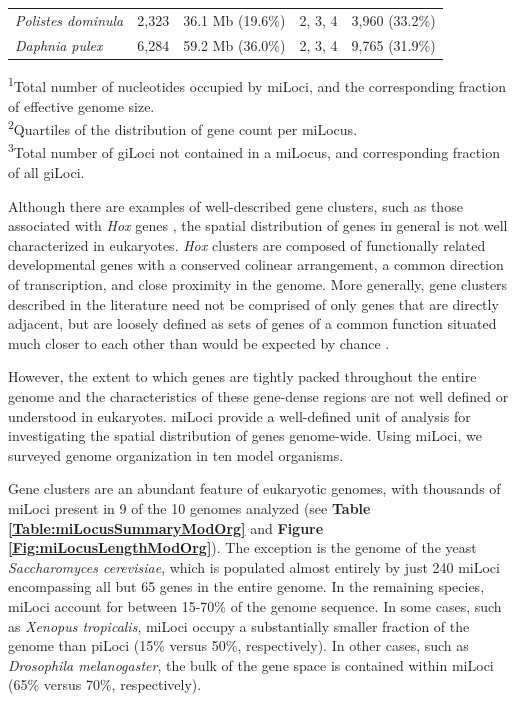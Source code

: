 \begin{table}[h]
\begin{tabularx}{\textwidth}{p{4cm}rrrr}
\textit{Polistes dominula}          &                2,323 &             36.1 Mb (19.6\%) &                       2, 3, 4 &                3,960 (33.2\%)  \\
\textit{Daphnia pulex}              &                6,284 &             59.2 Mb (36.0\%) &                       2, 3, 4 &                9,765 (31.9\%)  \\ \hline
\end{tabularx}
\raggedright
{\scriptsize
\textsuperscript{1}Total number of nucleotides occupied by miLoci, and the corresponding fraction of effective genome size. \\
\textsuperscript{2}Quartiles of the distribution of gene count per miLocus. \\
\textsuperscript{3}Total number of giLoci not contained in a miLocus, and corresponding fraction of all giLoci. \\
}
\end{table}

Although there are examples of well-described gene clusters, such as those associated with \textit{Hox} genes \cite{HoxClusters}, the spatial distribution of genes in general is not well characterized in eukaryotes.
\textit{Hox} clusters are composed of functionally related developmental genes with a conserved colinear arrangement, a common direction of transcription, and close proximity in the genome.
More generally, gene clusters described in the literature need not be comprised of only genes that are directly adjacent, but are loosely defined as sets of genes of a common function situated much closer to each other than would be expected by chance \cite{ClusterFunc}.

However, the extent to which genes are tightly packed throughout the entire genome and the characteristics of these gene-dense regions are not well defined or understood in eukaryotes.
miLoci provide a well-defined unit of analysis for investigating the spatial distribution of genes genome-wide.
Using miLoci, we surveyed genome organization in ten model organisms.

Gene clusters are an abundant feature of eukaryotic genomes, with thousands of miLoci present in 9 of the 10 genomes analyzed (see \textbf{Table \ref{Table:miLocusSummaryModOrg}} and \textbf{Figure \ref{Fig:miLocusLengthModOrg}}).
The exception is the genome of the yeast \textit{Saccharomyces cerevisiae}, which is populated almost entirely by just 240 miLoci encompassing all but 65 genes in the entire genome.
In the remaining species, miLoci account for between 15-70\% of the genome sequence.
In some cases, such as \textit{Xenopus tropicalis}, miLoci occupy a substantially smaller fraction of the genome than piLoci (15\% versus 50\%, respectively).
In other cases, such as \textit{Drosophila melanogaster}, the bulk of the gene space is contained within miLoci (65\% versus 70\%, respectively).

